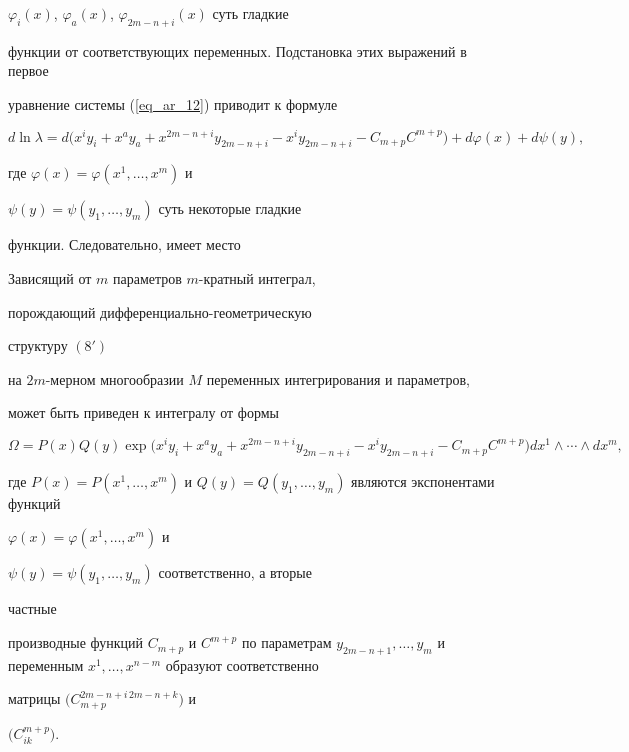 $\varphi_i(x)$, $\varphi_a(x)$, $\varphi_{2m-n+i}(x)$ суть гладкие


функции от соответствующих переменных. Подстановка этих выражений в первое


уравнение системы (\ref{eq_ar_12}) приводит к формуле


$$


d \ln\lambda=d\big(x^iy_i{+}x^ay_a{+}x^{2m-n+i}y_{2m-n+i}{-}x^iy_{2m-


n+i}{-}C_{m+p}C^{m+p}\big){+}d\varphi(x){+}d\psi(y),


$$


где $\varphi(x)=\varphi\left(x^1, \dotsc, x^m\right)$ и


$\psi(y)=\psi\left(y_1, \dotsc, y_m\right)$ суть некоторые гладкие


функции. Следовательно, имеет место 





\begin{thm}


Зависящий от $m$ параметров $m$-кратный интеграл, 


порождающий диф\-фе\-рен\-ци\-аль\-но-гео\-мет\-ри\-чес\-кую


структуру $(8')$


на $2m$-мерном многообразии $M$ переменных интегрирования и параметров, 


может быть приведен к интегралу от формы


$$


\Omega=P(x)Q(y)\exp\big(x^iy_i{+}x^ay_a{+}x^{2m-n+i}y_{2m-n+i}{-


}x^iy_{2m-n+i}{-}C_{m+p}C^{m+p}\big) dx^1\wedge \dotsb\wedge dx^m,


$$


где $P(x)=P\left(x^1, \dotsc, x^m\right)$ и $Q(y)=Q\left(y_1,


\dotsc, y_m\right)$ являются экспонентами функций


$\varphi(x)=\varphi\left(x^1, \dotsc, x^m\right)$ и


$\psi(y)=\psi\left(y_1, \dotsc, y_m\right)$ соответственно, а вторые


частные


производные функций $C_{m+p}$ и $C^{m+p}$ по параметрам $y_{2m-n+1},


\dotsc, y_m$ и переменным $x^1, \dotsc, x^{n-m}$ образуют соответственно


матрицы $\big(C^{2m-n+i\, 2m-n+k}_{m+p}\big)$ и


$\big(C^{m+p}_{ik}\big)$.


\end{thm}






